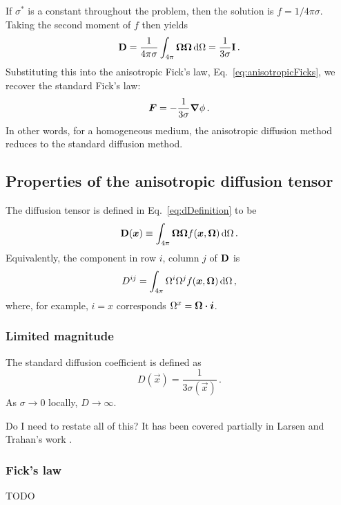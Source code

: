 If $\sigma^*$ is a constant throughout the problem, then the solution is
$f=1/4\pi\sigma$. Taking the second moment of $f$ then yields
\begin{equation*}
  \mathbf{D} = \frac{1}{4\pi\sigma} \int_{4\pi} \bm{\Omega} \bm{\Omega} \mathop{}\!\mathrm{d} \Omega
  = \frac{1}{3\sigma} \mathbf{I}\,.
\end{equation*}
Substituting this into the anisotropic Fick's law,
Eq.~\eqref{eq:anisotropicFicks}, we recover the standard Fick's law:
\begin{equation*}
  \bm{F} = - \frac{1}{3\sigma} \bm{\nabla} \phi\,.
\end{equation*}
In other words, for a homogeneous medium, the anisotropic diffusion method
reduces to the standard diffusion method.

\subsection{Properties of the anisotropic diffusion tensor}
The diffusion tensor is defined in Eq.~\eqref{eq:dDefinition} to be
\begin{equation*}
  \mathbf{D}(\bm{x}) \equiv \int_{4\pi} \bm{\Omega} \bm{\Omega}
  f(\bm{x}, \bm{\Omega}) \mathop{}\!\mathrm{d}\Omega \,.
\end{equation*}
Equivalently, the component in row $i$, column $j$ of $\mathbf{D}$ is
\begin{equation}\label{eq:dij}
  D^{ij} = \int_{4\pi} \Omega^i \Omega^j
  f(\bm{x}, \bm{\Omega}) \mathop{}\!\mathrm{d}\Omega \,,
\end{equation}
where, for example, $i=x$ corresponds $\Omega^x = \bm{\Omega} \bm{\cdot} \bm{i}$.

\subsubsection{Limited magnitude}
The standard diffusion coefficient is defined as
\begin{equation*}
  D(\vec{x}) = \frac{1}{3\sigma(\vec{x})} \,.
\end{equation*}
As $\sigma\to0$ locally, $D\to \infty$.

Do I need to restate all of this? It has been covered partially in Larsen and
Trahan's work \cite{Lar2009c}.

\subsubsection{Fick's law}
TODO

